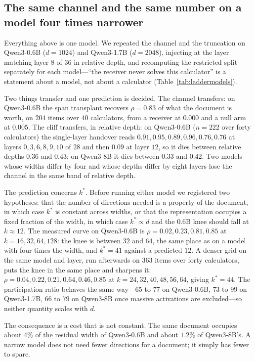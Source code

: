 \documentclass{article}
\begin{document}
\subsection{The same channel and the same number on a model four times
narrower}


Everything above is one model. We repeated the channel and the truncation on
Qwen3-0.6B ($d=1024$) and Qwen3-1.7B ($d=2048$), injecting at the layer matching
layer $8$ of $36$ in relative depth, and recomputing the restricted split
separately for each model---``the receiver never solves this calculator'' is a
statement about a model, not about a calculator
(Table~\ref{tab:laddermodels}).

Two things transfer and one prediction is decided. The channel transfers: on
Qwen3-0.6B the span transplant recovers $\rho = 0.83$ of what the document is
worth, on $204$ items over $40$ calculators, from a receiver at $0.000$ and a
null arm at $0.005$. The cliff transfers, in relative depth: on Qwen3-0.6B
($n=222$ over forty calculators) the single-layer handover reads
$0.91, 0.95, 0.89, 0.96, 0.76, 0.76$ at layers $0,3,6,8,9,10$ of $28$ and then
$0.09$ at layer $12$, so it dies between relative depths $0.36$ and $0.43$; on
Qwen3-8B it dies between $0.33$ and $0.42$. Two models whose widths differ by
four and whose depths differ by eight layers lose the channel in the same
band of relative depth.

The prediction concerns $k^{*}$. Before running either model we registered two
hypotheses: that the number of directions needed is a property of the document,
in which case $k^{*}$ is constant across widths, or that the representation
occupies a fixed fraction of the width, in which case $k^{*}\propto d$ and the
$0.6$B knee should fall at $k\approx12$. The measured curve on Qwen3-0.6B is
$\rho = 0.02, 0.23, 0.81, 0.85$ at $k = 16, 32, 64, 128$: the knee is between
$32$ and $64$, the same place as on a model with four times the width, and
$k^{*}=41$ against a predicted $12$. A denser grid on the same model and layer,
run afterwards on $363$ items over forty calculators, puts the knee in the same
place and sharpens it: $\rho = 0.04, 0.22, 0.21, 0.64, 0.46, 0.85$ at
$k = 24, 32, 40, 48, 56, 64$, giving $k^{*}=44$. The participation ratio behaves the
same way---$65$ to $77$ on Qwen3-0.6B, $73$ to $99$ on Qwen3-1.7B, $66$ to $79$
on Qwen3-8B once massive activations are excluded---so neither quantity scales
with $d$.

The consequence is a cost that is not constant. The same document occupies
about $4\%$ of the residual width of Qwen3-0.6B and about $1.2\%$ of Qwen3-8B's.
A narrow model does not need fewer directions for a document; it simply has
fewer to spare.
\end{document}
